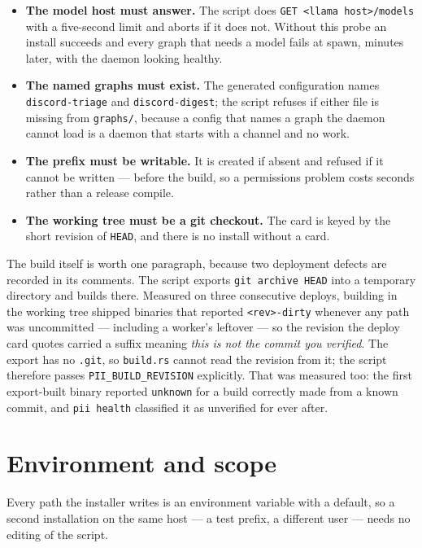 \begin{itemize}
	\item \textbf{The model host must answer.} The script does
        \texttt{GET \textless{}llama host\textgreater{}/models} with a five-second limit and
aborts if it does not.
	Without this probe an install succeeds and every graph that needs a model fails at
	spawn, minutes later, with the daemon looking healthy.
	\item \textbf{The named graphs must exist.} The generated configuration names
	\texttt{discord-triage} and \texttt{discord-digest}; the script refuses if either file
	is missing from \texttt{graphs/}, because a config that names a graph the daemon cannot
	load is a daemon that starts with a channel and no work.
	\item \textbf{The prefix must be writable.} It is created if absent and refused if it
	cannot be written --- before the build, so a permissions problem costs seconds rather
	than a release compile.
	\item \textbf{The working tree must be a git checkout.} The card is keyed by the short
	revision of \texttt{HEAD}, and there is no install without a card.
\end{itemize}

The build itself is worth one paragraph, because two deployment defects are recorded in
its comments. The script exports \texttt{git archive HEAD} into a temporary directory and
builds there. Measured on three consecutive deploys, building in the working tree shipped
binaries that reported \texttt{\textless{}rev\textgreater{}-dirty} whenever any path was
uncommitted --- including
a worker's leftover --- so the revision the deploy card quotes carried a suffix meaning
\emph{this is not the commit you verified}. The export has no \texttt{.git}, so
\texttt{build.rs} cannot read the revision from it; the script therefore passes
\texttt{PII\_BUILD\_REVISION} explicitly. That was measured too: the first export-built
binary reported \texttt{unknown} for a build correctly made from a known commit, and
\texttt{pii health} classified it as unverified for ever after.

\section{Environment and scope}

Every path the installer writes is an environment variable with a default, so a second
installation on the same host --- a test prefix, a different user --- needs no editing of
the script.

